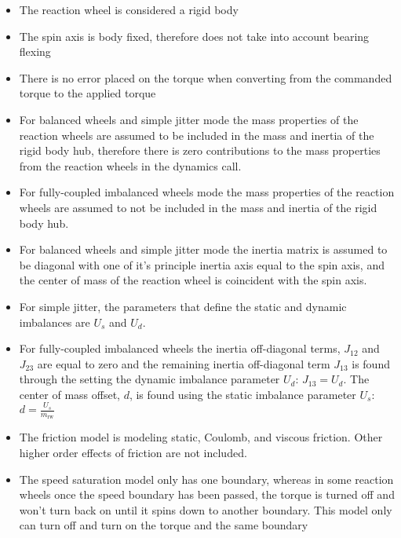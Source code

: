 \begin{itemize}
	\item The reaction wheel is considered a rigid body
	\item The spin axis is body fixed, therefore does not take into account bearing flexing
	\item There is no error placed on the torque when converting from the commanded torque to the applied torque
	\item For balanced wheels and simple jitter mode the mass properties of the reaction wheels are assumed to be included in the mass and inertia of the rigid body hub, therefore there is zero contributions to the mass properties from the reaction wheels in the dynamics call. 
	\item For fully-coupled imbalanced wheels mode the mass properties of the reaction wheels are assumed to not be included in the mass and inertia of the rigid body hub. 
	\item For balanced wheels and simple jitter mode the inertia matrix is assumed to be diagonal with one of it's principle inertia axis equal to the spin axis, and the center of mass of the reaction wheel is coincident with the spin axis. 
	\item For simple jitter, the parameters that define the static and dynamic imbalances are $U_s$ and $U_d$.
	\item For fully-coupled imbalanced wheels the inertia off-diagonal terms, $J_{12}$ and $J_{23}$ are equal to zero and the remaining inertia off-diagonal term $J_{13}$ is found through the setting the dynamic imbalance parameter $U_d$: $J_{13} = U_d$. The center of mass offset, $d$, is found using the static imbalance parameter $U_s$: $d = \frac{U_s}{m_{\text{rw}}}$
	\item The friction model is modeling static, Coulomb, and viscous friction. Other higher order effects of friction are not included. 
	\item The speed saturation model only has one boundary, whereas in some reaction wheels once the speed boundary has been passed, the torque is turned off and won't turn back on until it spins down to another boundary. This model only can turn off and turn on the torque and the same boundary
\end{itemize}